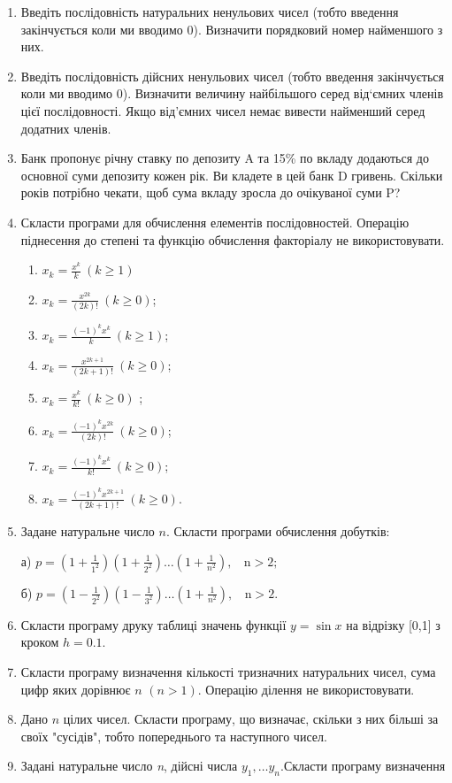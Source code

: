 \documentclass[a5paper,titlepage,openany,twoside,draft]{book_unv}%
\makeatletter
\newcommand{\xslalph}[1]{\expandafter\@xslalph\csname c@#1\endcsname}
\newcommand{\@xslalph}[1]{%
    \ifcase#1\or а\or б\or в\or г\or д\or e\or є\or ж\or з\or i%
    \or й\or к\or л\or м\or н\or о\or п\or р\or с\or т%
    \or у\or ф\or х\or ц\or ч\or ш\or ю\or я\or аа\or бб\or вв%
    \else\@ctrerr\fi%
}
\makeatother
\begin{document}
\begin{enumerate}
\item
  Введіть послідовність натуральних ненульових чисел (тобто введення
  закінчується коли ми вводимо 0). Визначити порядковий номер найменшого
  з них.
\item
  Введіть послідовність дійсних ненульових чисел (тобто введення
  закінчується коли ми вводимо 0). Визначити величину найбільшого серед
  від`ємних членів цієї послідовності. Якщо від'ємних чисел немає
  вивести найменший серед додатних членів.
\item
  Банк пропонує річну ставку по депозиту A та 15\% по вкладу додаються
  до основної суми депозиту кожен рік. Ви кладете в цей банк D гривень.
  Скільки років потрібно чекати, щоб сума вкладу зросла до очікуваної
  суми P?
\item
  Скласти програми для обчислення елементів послідовностей. Операцію
  піднесення до степені та функцію обчислення факторіалу не
  використовувати.
  \begin{multicols}{2}
\begin{enumerate}[label=\xslalph*)]
\item
\(x_{k} = \frac{x^{k}}{k}\ (k \geq 1)\) 
\item
\(x_{k} = \frac{x^{2k}}{(2k)!}\ (k \geq 0)\);
\item \(x_{k} = \frac{( - 1)^{k}x^{k}}{k}\ (k \geq 1)\); 
\item
\(x_{k} = \frac{x^{2k + 1}}{(2k + 1)!}\ (k \geq 0)\);
\item \(x_{k} = \frac{x^{k}}{k!}\ (k \geq 0)\) ;
\item \(x_{k} = \frac{(-1)^{k}x^{2k}}{(2k)!}\ (k \geq 0)\);
\item \(x_{k} = \frac{(-1)^{k}x^{k}}{k!}\ (k \geq 0)\); 
\item \(x_{k} = \frac{(-1)^{k}x^{2k + 1}}{(2k + 1)!}\ (k \geq  0)\).
 \end{enumerate}
  \end{multicols}
\item
  Задане натуральне число \(n\). Скласти програми обчислення добутків:

а)
\(p = \left( 1 + \frac{1}{1^{2}} \right)\left( 1 + \frac{1}{2^{2}} \right)\ldots\left( 1 + \frac{1}{n^{2}} \right),\mathrm{\ \ \ \ n > 2};\)

б)
\(p = \left( 1 - \frac{1}{2^{2}} \right)\left( 1 - \frac{1}{3^{2}} \right)\ldots\left( 1 + \frac{1}{n^{2}} \right),\mathrm{\ \ \ \ n > 2.}\)

\item
  Скласти програму друку таблиці значень функції \(y = \sin x\) на
  відрізку {[}0,1{]} з кроком \(h = 0.1\).
\item
  Скласти програму визначення кількості тризначних натуральних чисел,
  сума цифр яких дорівнює \(n\) \((n > 1)\). Операцію ділення не
  використовувати.
\item
  Дано \(n\) цілих чисел. Скласти програму, що визначає, скільки з
  них більші за своїх "сусідів", тобто попереднього та наступного чисел.
\item
  Задані натуральне число \emph{n}, дійсні числа
  \(y_{1},\ldots y_{n}.\)Скласти програму визначення


\end{enumerate}
\end{document}
